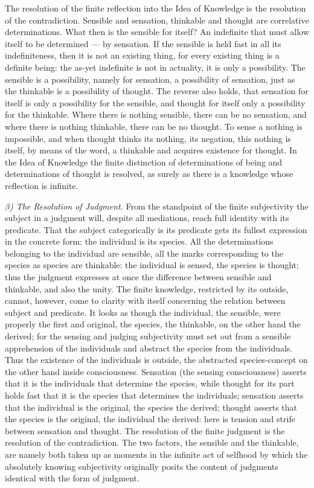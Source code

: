 \documentclass[12pt]{book}
\begin{document}
The resolution of the finite reflection into the Idea of Knowledge is the
resolution of the contradiction. Sensible and sensation, thinkable and thought
are correlative determinations. What then is the sensible for itself? An
indefinite that must allow itself to be determined --- by sensation. If the
sensible is held fast in all its indefiniteness, then it is not an existing
thing, for every existing thing is a definite being: the as-yet indefinite is not
in actuality, it is only a possibility. The sensible is a possibility, namely for
sensation, a possibility of sensation, just as the thinkable is a possibility of
thought. The reverse also holds, that sensation for itself is only a possibility
for the sensible, and thought for itself only a possibility for the thinkable.
Where there is nothing sensible, there can be no sensation, and where there is
nothing thinkable, there can be no thought. To sense a nothing is impossible, and
when thought thinks its nothing, its negation, this nothing is itself, by means
of the word, a thinkable and acquires existence for thought. In the Idea of
Knowledge the finite distinction of determinations of being and determinations of
thought is resolved, as surely as there is a knowledge whose reflection is
infinite.

\emph{$\beta$) The Resolution of Judgment.} From the standpoint of the finite
subjectivity the subject in a judgment will, despite all mediations, reach full
identity with its predicate. That the subject categorically is its predicate gets
its fullest expression in the concrete form: the individual is its species. All
the determinations belonging to the individual are sensible, all the marks
corresponding to the species as species are thinkable: the individual is sensed,
the species is thought; thus the judgment expresses at once the difference between
sensible and thinkable, and also the unity. The finite knowledge, restricted by
its outside, cannot, however, come to clarity with itself concerning the relation
between subject and predicate. It looks as though the individual, the sensible,
were properly the first and original, the species, the thinkable, on the other
hand the derived; for the sensing and judging subjectivity must set out from a
sensible apprehension of the individuals and abstract the species from the
individuals. Thus the existence of the individuals is outside, the abstracted
species-concept on the other hand inside consciousness. Sensation (the sensing
consciousness) asserts that it is the individuals that determine the species,
while thought for its part holds fast that it is the species that determines the
individuals; sensation asserts that the individual is the original, the species
the derived; thought asserts that the species is the original, the individual the
derived: here is tension and strife between sensation and thought. The resolution
of the finite judgment is the resolution of the contradiction. The two factors,
the sensible and the thinkable, are namely both taken up as moments in the
infinite act of selfhood by which the absolutely knowing subjectivity originally
posits the content of judgments identical with the form of judgment.
\end{document}

